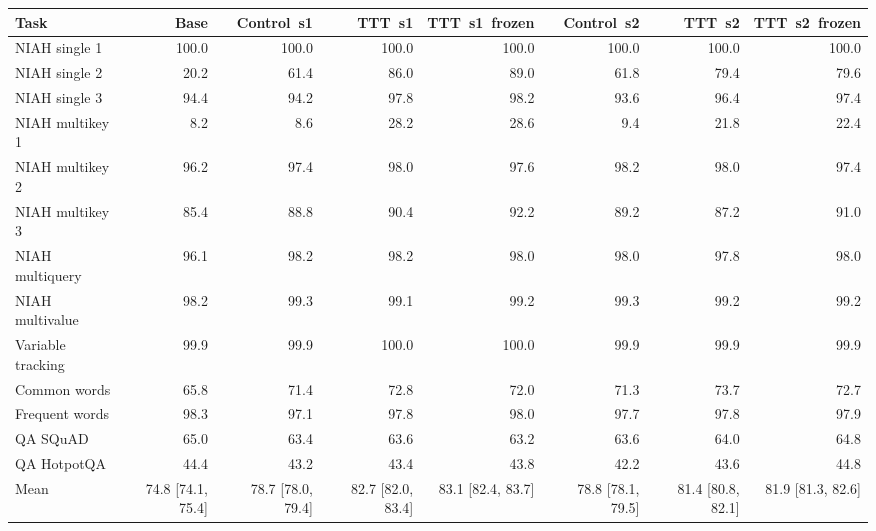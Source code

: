 \begin{tabular}{lrrrrrrr}
\toprule
Task & Base & Control~s1 & TTT~s1 & TTT~s1~frozen & Control~s2 & TTT~s2 & TTT~s2~frozen \\
\midrule
NIAH single 1 & 100.0 & 100.0 & 100.0 & 100.0 & 100.0 & 100.0 & 100.0 \\
NIAH single 2 & 20.2 & 61.4 & 86.0 & 89.0 & 61.8 & 79.4 & 79.6 \\
NIAH single 3 & 94.4 & 94.2 & 97.8 & 98.2 & 93.6 & 96.4 & 97.4 \\
NIAH multikey 1 & 8.2 & 8.6 & 28.2 & 28.6 & 9.4 & 21.8 & 22.4 \\
NIAH multikey 2 & 96.2 & 97.4 & 98.0 & 97.6 & 98.2 & 98.0 & 97.4 \\
NIAH multikey 3 & 85.4 & 88.8 & 90.4 & 92.2 & 89.2 & 87.2 & 91.0 \\
NIAH multiquery & 96.1 & 98.2 & 98.2 & 98.0 & 98.0 & 97.8 & 98.0 \\
NIAH multivalue & 98.2 & 99.3 & 99.1 & 99.2 & 99.3 & 99.2 & 99.2 \\
Variable tracking & 99.9 & 99.9 & 100.0 & 100.0 & 99.9 & 99.9 & 99.9 \\
Common words & 65.8 & 71.4 & 72.8 & 72.0 & 71.3 & 73.7 & 72.7 \\
Frequent words & 98.3 & 97.1 & 97.8 & 98.0 & 97.7 & 97.8 & 97.9 \\
QA SQuAD & 65.0 & 63.4 & 63.6 & 63.2 & 63.6 & 64.0 & 64.8 \\
QA HotpotQA & 44.4 & 43.2 & 43.4 & 43.8 & 42.2 & 43.6 & 44.8 \\
\midrule
Mean & 74.8 [74.1, 75.4] & 78.7 [78.0, 79.4] & 82.7 [82.0, 83.4] & 83.1 [82.4, 83.7] & 78.8 [78.1, 79.5] & 81.4 [80.8, 82.1] & 81.9 [81.3, 82.6] \\
\bottomrule
\end{tabular}
